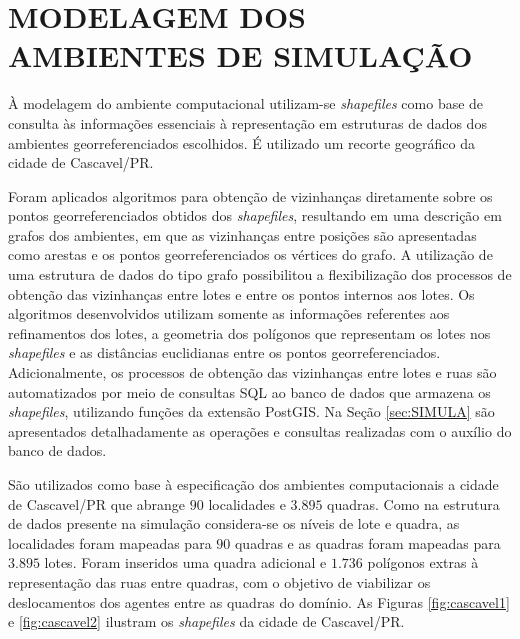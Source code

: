 \section{MODELAGEM DOS AMBIENTES DE SIMULAÇÃO}
\label{sec:modelagemAmbiente}

À modelagem do ambiente computacional utilizam-se \textit{shapefiles} como base de consulta às informações essenciais à representação em estruturas de dados dos ambientes georreferenciados escolhidos. É utilizado um recorte geográfico da cidade de Cascavel/PR.

Foram aplicados algoritmos para obtenção de vizinhanças diretamente sobre os pontos georreferenciados obtidos dos \textit{shapefiles}, resultando em uma descrição em grafos dos ambientes, em que as vizinhanças entre posições são apresentadas como arestas e os pontos georreferenciados os vértices do grafo. A utilização de uma estrutura de dados do tipo grafo possibilitou a flexibilização dos processos de obtenção das vizinhanças entre lotes e entre os pontos internos aos lotes. Os algoritmos desenvolvidos utilizam somente as informações referentes aos refinamentos dos lotes, a geometria dos polígonos que representam os lotes nos \textit{shapefiles} e as distâncias euclidianas entre os pontos georreferenciados. Adicionalmente, os processos de obtenção das vizinhanças entre lotes e ruas são automatizados por meio de consultas SQL ao banco de dados que armazena os \textit{shapefiles}, utilizando funções da extensão PostGIS. Na Seção \ref{sec:SIMULA} são apresentados detalhadamente as operações e consultas realizadas com o auxílio do banco de dados. 

São utilizados como base à especificação dos ambientes computacionais a cidade de Cascavel/PR que abrange $90$ localidades e $3.895$ quadras. Como na estrutura de dados presente na simulação considera-se os níveis de lote e quadra, as localidades foram mapeadas para $90$ quadras e as quadras foram mapeadas para $3.895$ lotes. Foram inseridos uma quadra adicional e $1.736$ polígonos extras à representação das ruas entre quadras, com o objetivo de viabilizar os deslocamentos dos agentes entre as quadras do domínio. As Figuras \ref{fig:cascavel1} e \ref{fig:cascavel2} ilustram os \textit{shapefiles} da cidade de Cascavel/PR. 

